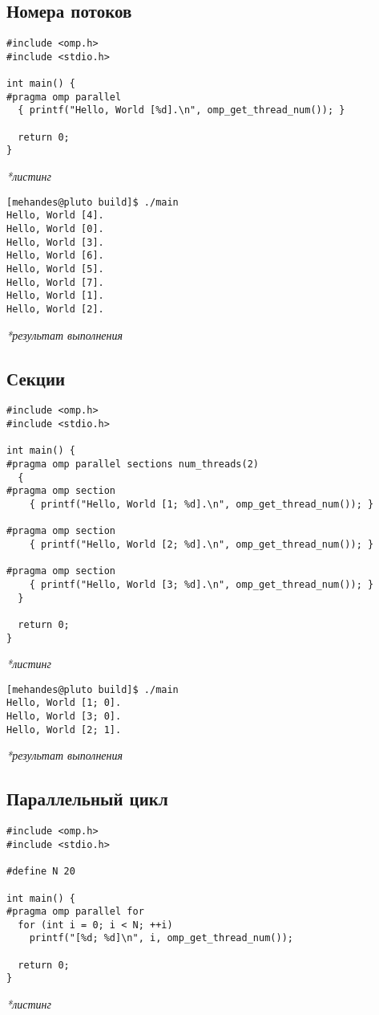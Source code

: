 \documentclass[12pt, a4paper]{article}
\begin{document}
\subsection{Номера потоков}

\begin{verbatim}
#include <omp.h>
#include <stdio.h>

int main() {
#pragma omp parallel
  { printf("Hello, World [%d].\n", omp_get_thread_num()); }

  return 0;
}
\end{verbatim}
\textit{*листинг}

\begin{verbatim}
[mehandes@pluto build]$ ./main
Hello, World [4].
Hello, World [0].
Hello, World [3].
Hello, World [6].
Hello, World [5].
Hello, World [7].
Hello, World [1].
Hello, World [2].
\end{verbatim}
\textit{*результат выполнения}

\subsection{Секции}

\begin{verbatim}
#include <omp.h>
#include <stdio.h>

int main() {
#pragma omp parallel sections num_threads(2)
  {
#pragma omp section
    { printf("Hello, World [1; %d].\n", omp_get_thread_num()); }

#pragma omp section
    { printf("Hello, World [2; %d].\n", omp_get_thread_num()); }

#pragma omp section
    { printf("Hello, World [3; %d].\n", omp_get_thread_num()); }
  }

  return 0;
}
\end{verbatim}
\textit{*листинг}

\begin{verbatim}
[mehandes@pluto build]$ ./main
Hello, World [1; 0].
Hello, World [3; 0].
Hello, World [2; 1].
\end{verbatim}
\textit{*результат выполнения}

\subsection{Параллельный цикл}

\begin{verbatim}
#include <omp.h>
#include <stdio.h>

#define N 20

int main() {
#pragma omp parallel for
  for (int i = 0; i < N; ++i)
    printf("[%d; %d]\n", i, omp_get_thread_num());

  return 0;
}
\end{verbatim}
\textit{*листинг}
\end{document}
